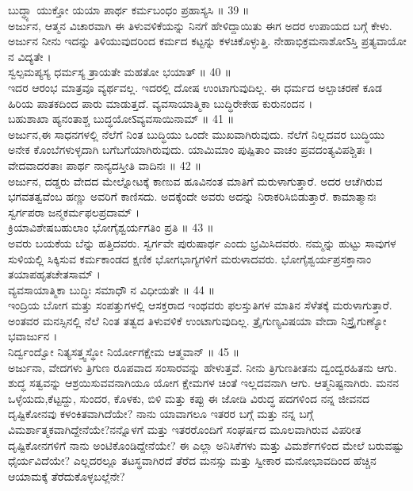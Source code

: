 ಬುದ್ಧ್ಯಾ ಯುಕ್ತೋ ಯಯಾ ಪಾರ್ಥ ಕರ್ಮಬಂಧಂ ಪ್ರಹಾಸ್ಯಸಿ ॥ 39 ॥\\
 ಅರ್ಜುನ, ಆತ್ಮನ ವಿಚಾರವಾಗಿ ಈ ತಿಳುವಳಿಕೆಯನ್ನು ನಿನಗೆ ಹೇಳಿದ್ದಾಯಿತು ಈಗ ಅದರ ಉಪಾಯದ ಬಗ್ಗೆ ಕೇಳು. ಅರ್ಜುನ ನೀನು ಇದನ್ನು ತಿಳಿಯುವುದರಿಂದ ಕರ್ಮದ ಕಟ್ಟನ್ನು ಕಳಚಿಕೊಳ್ಳುತ್ತಿ.
ನೇಹಾಭಿಕ್ರಮನಾಶೋऽಸ್ತಿ ಪ್ರತ್ಯವಾಯೋ ನ ವಿದ್ಯತೇ ।\\
ಸ್ವಲ್ಪಮಪ್ಯಸ್ಯ ಧರ್ಮಸ್ಯ ತ್ರಾಯತೇ ಮಹತೋ ಭಯಾತ್ ॥ 40 ॥\\
 ಇದರ ಆರಂಭ ಮಾತ್ರವೂ ವ್ಯರ್ಥವಲ್ಲ. ಇದರಲ್ಲಿ ದೋಷ ಉಂಟಾಗುವುದಿಲ್ಲ. ಈ ಧರ್ಮದ ಅಲ್ಪಾಚರಣೆ ಕೂಡ ಹಿರಿಯ ಪಾತಕದಿಂದ ಪಾರು ಮಾಡುತ್ತದೆ.
ವ್ಯವಸಾಯಾತ್ಮಿಕಾ ಬುದ್ಧಿರೇಕೇಹ ಕುರುನಂದನ ।\\
ಬಹುಶಾಖಾ ಹ್ಯನಂತಾಶ್ಚ ಬುದ್ಧಯೋऽವ್ಯವಸಾಯಿನಾಮ್ ॥ 41 ॥\\
 ಅರ್ಜುನ,ಈ ಸಾಧನಗಳಲ್ಲಿ ನೆಲೆಗೆ ನಿಂತ ಬುದ್ಧಿಯು ಒಂದೇ ಮುಖವಾಗಿರುವುದು. ನೆಲೆಗೆ ನಿಲ್ಲದವರ ಬುದ್ಧಿಯು ಅನೇಕ ಕೊಂಬೆಗಳುಳ್ಳದಾಗಿ ಬಗೆಬಗೆಯಾಗಿರುವುದು. 
ಯಾಮಿಮಾಂ ಪುಷ್ಪಿತಾಂ ವಾಚಂ ಪ್ರವದಂತ್ಯವಿಪಶ್ಚಿತಃ ।\\
ವೇದವಾದರತಾಃ ಪಾರ್ಥ ನಾನ್ಯದಸ್ತೀತಿ ವಾದಿನಃ ॥ 42 ॥\\
 ಅರ್ಜುನ, ದಡ್ಡರು ವೇದದ ಮೇಲ್ನೋಟಕ್ಕೆ ಕಾಣುವ ಹೂವಿನಂತ ಮಾತಿಗೆ ಮರುಳಾಗುತ್ತಾರೆ. ಅದರ ಆಚೆಗಿರುವ ಭಗವತತ್ವವೆಂಬ ಹಣ್ಣು ಅವರಿಗೆ ಕಾಣಿಸದು. ಅದಕ್ಕೆಂದೇ ಅವರು ಅದನ್ನು ನಿರಾಕರಿಸಿಬಿಡುತ್ತಾರೆ.
ಕಾಮಾತ್ಮಾನಃ ಸ್ವರ್ಗಪರಾ ಜನ್ಮಕರ್ಮಫಲಪ್ರದಾಮ್ ।\\
ಕ್ರಿಯಾವಿಶೇಷಬಹುಲಾಂ ಭೋಗೈಶ್ವರ್ಯಗತಿಂ ಪ್ರತಿ ॥ 43 ॥\\
 ಅವರು ಬಯಕೆಯ ಬೆನ್ನು ಹತ್ತಿದವರು. ಸ್ವರ್ಗವೇ ಪುರುಷಾರ್ಥ ಎಂದು ಭ್ರಮಿಸಿದವರು. ನಮ್ಮನ್ನು ಹುಟ್ಟು ಸಾವುಗಳ ಸುಳಿಯಲ್ಲಿ ಸಿಕ್ಕಿಸುವ ಕರ್ಮಕಾಂಡದ ಕ್ಷಣಿಕ ಭೋಗಭಾಗ್ಯಗಳಿಗೆ ಮರುಳಾದವರು.
ಭೋಗೈಶ್ವರ್ಯಪ್ರಸಕ್ತಾನಾಂ ತಯಾಪಹೃತಚೇತಸಾಮ್ ।\\
ವ್ಯವಸಾಯಾತ್ಮಿಕಾ ಬುದ್ಧಿಃ ಸಮಾಧೌ ನ ವಿಧೀಯತೇ ॥ 44 ॥\\
 ಇಂದ್ರಿಯ ಬೋಗ ಮತ್ತು ಸಂಪತ್ತುಗಳಲ್ಲಿ ಆಸಕ್ತರಾದ ಇಂಥವರು ಫಲಸ್ತುತಿಗಳ ಮಾತಿನ ಸೆಳೆತಕ್ಕೆ ಮರುಳಾಗುತ್ತಾರೆ. ಅಂತವರ ಮನಸ್ಸಿನಲ್ಲಿ ನೆಲೆ ನಿಂತ ತತ್ವದ ತಿಳುವಳಿಕೆ ಉಂಟಾಗುವುದಿಲ್ಲ.
ತ್ರೈಗುಣ್ಯವಿಷಯಾ ವೇದಾ ನಿಸ್ತ್ರೈಗುಣ್ಯೋ ಭವಾರ್ಜುನ ।\\
ನಿರ್ದ್ವಂದ್ವೋ ನಿತ್ಯಸತ್ತ್ವಸ್ಥೋ ನಿರ್ಯೋಗಕ್ಷೇಮ ಆತ್ಮವಾನ್ ॥ 45 ॥\\
 ಅರ್ಜುನಾ, ವೇದಗಳು ತ್ರಿಗುಣ ರೂಪವಾದ ಸಂಸಾರವನ್ನು ಹೇಳುತ್ತವೆ. ನೀನು ತ್ರಿಗುಣತೀತನು ದ್ವಂದ್ವರಹಿತನು ಆಗು. ಶುದ್ಧ ಸತ್ವವನ್ನು ಆಶ್ರಯಿಸುವವನಾಗಿಯೂ ಯೋಗ ಕ್ಷೇಮಗಳ ಚಿಂತೆ ಇಲ್ಲದವನಾಗಿ  ಆಗು. ಆತ್ಮನಿಷ್ಟನಾಗಿರು.
ಮನನ
 ಒಳ್ಳೆಯದು,ಕೆಟ್ಟದ್ದು, ಸುಂದರ, ಕೊಳಕು, ಬಿಳಿ ಮತ್ತು ಕಪ್ಪು ಈ ಜೋಡಿ ವಿರುದ್ಧ ಪದಗಳಿಂದ ನನ್ನ ಜೀವನದ ದೃಷ್ಟಿಕೋನವು ಕಳಂಕಿತವಾಗಿದೆಯೇ? ನಾನು ಯಾವಾಗಲೂ ಇತರರ ಬಗ್ಗೆ ಮತ್ತು ನನ್ನ ಬಗ್ಗೆ ವಿಮರ್ಶಾತ್ಮಕವಾಗಿದ್ದೇನೆಯೇ?ನನ್ನೊಳಗೆ ಮತ್ತು ಇತರರೊಂದಿಗೆ ಸಂಘರ್ಷದ ಮೂಲವಾಗಿರುವ ವಿಪರೀತ ದೃಷ್ಟಿಕೋನಗಳಿಗೆ ನಾನು ಅಂಟಿಕೊಂಡಿದ್ದೇನೆಯೇ? ಈ ಎಲ್ಲಾ ಅನಿಸಿಕೆಗಳು ಮತ್ತು ವಿಮರ್ಶೆಗಳಿಂದ ಮೇಲೆ ಬರುವಷ್ಟು ಧೈರ್ಯವಿದೆಯೇ? ಎಲ್ಲದರಲ್ಲೂ ತಟಸ್ಥವಾಗಿರದೆ ತೆರೆದ ಮನಸ್ಸು ಮತ್ತು ಸ್ವೀಕಾರ ಮನೋಭಾವದಿಂದ ಹೆಚ್ಚಿನ ಆಯಾಮಕ್ಕೆ ತೆರೆದುಕೊಳ್ಳಬಲ್ಲೆನೇ?
